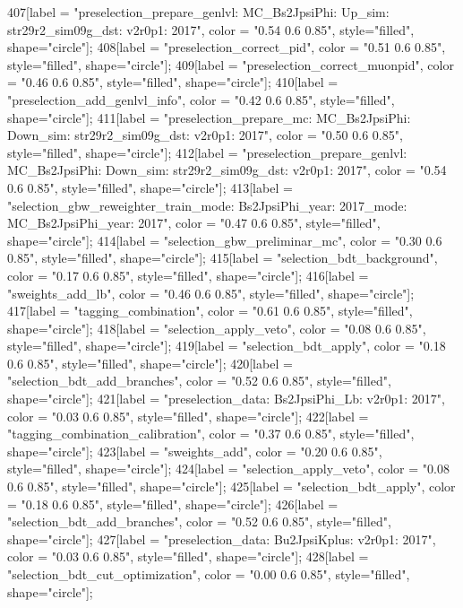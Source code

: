 {	407[label = "preselection_prepare_genlvl\nmode: MC_Bs2JpsiPhi\npolarity: Up\nstrip_sim: str29r2_sim09g_dst\nversion: v2r0p1\nyear: 2017", color = "0.54 0.6 0.85", style="filled", shape="circle"];
	408[label = "preselection_correct_pid", color = "0.51 0.6 0.85", style="filled", shape="circle"];
	409[label = "preselection_correct_muonpid", color = "0.46 0.6 0.85", style="filled", shape="circle"];
	410[label = "preselection_add_genlvl_info", color = "0.42 0.6 0.85", style="filled", shape="circle"];
	411[label = "preselection_prepare_mc\nmode: MC_Bs2JpsiPhi\npolarity: Down\nstrip_sim: str29r2_sim09g_dst\nversion: v2r0p1\nyear: 2017", color = "0.50 0.6 0.85", style="filled", shape="circle"];
	412[label = "preselection_prepare_genlvl\nmode: MC_Bs2JpsiPhi\npolarity: Down\nstrip_sim: str29r2_sim09g_dst\nversion: v2r0p1\nyear: 2017", color = "0.54 0.6 0.85", style="filled", shape="circle"];
	413[label = "selection_gbw_reweighter_train\ndata_mode: Bs2JpsiPhi\ndata_year: 2017\nmc_mode: MC_Bs2JpsiPhi\nmc_year: 2017", color = "0.47 0.6 0.85", style="filled", shape="circle"];
	414[label = "selection_gbw_preliminar_mc", color = "0.30 0.6 0.85", style="filled", shape="circle"];
	415[label = "selection_bdt_background", color = "0.17 0.6 0.85", style="filled", shape="circle"];
	416[label = "sweights_add_lb", color = "0.46 0.6 0.85", style="filled", shape="circle"];
	417[label = "tagging_combination", color = "0.61 0.6 0.85", style="filled", shape="circle"];
	418[label = "selection_apply_veto", color = "0.08 0.6 0.85", style="filled", shape="circle"];
	419[label = "selection_bdt_apply", color = "0.18 0.6 0.85", style="filled", shape="circle"];
	420[label = "selection_bdt_add_branches", color = "0.52 0.6 0.85", style="filled", shape="circle"];
	421[label = "preselection_data\nmode: Bs2JpsiPhi_Lb\nversion: v2r0p1\nyear: 2017", color = "0.03 0.6 0.85", style="filled", shape="circle"];
	422[label = "tagging_combination_calibration", color = "0.37 0.6 0.85", style="filled", shape="circle"];
	423[label = "sweights_add", color = "0.20 0.6 0.85", style="filled", shape="circle"];
	424[label = "selection_apply_veto", color = "0.08 0.6 0.85", style="filled", shape="circle"];
	425[label = "selection_bdt_apply", color = "0.18 0.6 0.85", style="filled", shape="circle"];
	426[label = "selection_bdt_add_branches", color = "0.52 0.6 0.85", style="filled", shape="circle"];
	427[label = "preselection_data\nmode: Bu2JpsiKplus\nversion: v2r0p1\nyear: 2017", color = "0.03 0.6 0.85", style="filled", shape="circle"];
	428[label = "selection_bdt_cut_optimization", color = "0.00 0.6 0.85", style="filled", shape="circle"];
}
